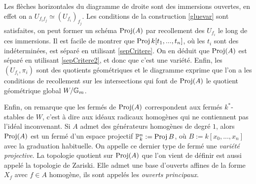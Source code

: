 Les flèches horizontales du diagramme de droite sont des immersions ouvertes, en effet on a $U_{f_if_j}\simeq (U_{f_i})_{f_j}$. Les conditions de la construction \ref{gluevar} sont satisfaites, on peut former un schéma $\operatorname{Proj}(A)$ par recollement des $U_{f_i}$ le long de ces immersions. Il est facile de montrer que $\operatorname{Proj} k[t_1,...,t_n]$, où les $t_i$ sont des indéterminées, est séparé en utilisant \ref{sepCritere}. On en déduit que $\operatorname{Proj}(A)$ est séparé en utilisant \ref{sepCritere2}, et donc que c'est une variété. Enfin, les $(U_{f_i},\pi_i)$ sont des quotients géométriques et le diagramme exprime que l'on a les conditions de recollement sur les intersections qui font de $\operatorname{Proj}(A)$ le quotient géométrique global $W/\mathbb{G}_m$. 

Enfin, on remarque que les fermés de $\operatorname{Proj}(A)$ correspondent aux fermés $k^*$-stables de $W$, c'est à dire aux idéaux radicaux homogènes qui ne contiennent pas l'idéal inconvenant. Si $A$ admet des générateurs homogènes de degré $1$, alors $\operatorname{Proj}(A)$ est un fermé d'un espace projectif $\mathbb{P}^n_k:=\operatorname{Proj} B$, où $B:=k[x_0,...,x_n]$ avec la graduation habituelle. On appelle ce dernier type de fermé une \textit{variété projective}. La topologie quotient sur $\operatorname{Proj}(A)$ que l'on vient de définir est aussi appelé la topologie de Zariski. Elle admet une base d'ouverts affines de la forme $X_f$ avec $f\in A$ homogène, ils sont appelés les \textit{ouverts principaux}. 
